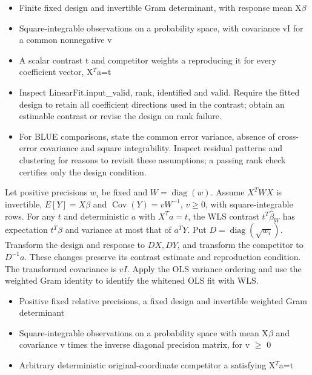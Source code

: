 \expandafter\def\csname statadic@assumptions@STATADIC-LINEAR-010\endcsname{\begin{itemize}
\item Finite fixed design and invertible Gram determinant, with response mean X\ensuremath{\beta}
\item Square-integrable observations on a probability space, with covariance vI for a common nonnegative v
\item A scalar contrast t and competitor weights a reproducing it for every coefficient vector, X\ensuremath{{}^T}a=t
\end{itemize}}
\expandafter\def\csname statadic@diagnostics@STATADIC-LINEAR-010\endcsname{\begin{itemize}
\item Inspect LinearFit.input\_valid, rank, identified and valid. Require the fitted design to retain all coefficient directions used in the contrast; obtain an estimable contrast or revise the design on rank failure.
\item For BLUE comparisons, state the common error variance, absence of cross-error covariance and square integrability. Inspect residual patterns and clustering for reasons to revisit these assumptions; a passing rank check certifies only the design condition.
\end{itemize}}
\expandafter\def\csname statadic@statement@STATADIC-LINEAR-011\endcsname{Let positive precisions $w_i$ be fixed and
  $W=\operatorname{diag}(w)$. Assume $X^TWX$ is invertible, $E[Y]=X\beta$
  and $\operatorname{Cov}(Y)=vW^{-1}$, $v\ge0$, with square-integrable rows.
  For any $t$ and deterministic $a$ with $X^Ta=t$, the WLS contrast
  $t^T\hat\beta_W$ has expectation $t^T\beta$ and variance at most that of $a^TY$.}
\expandafter\def\csname statadic@proof@STATADIC-LINEAR-011\endcsname{Put $D=\operatorname{diag}(\sqrt{w_i})$. Transform the design
  and response to $DX,DY$, and transform the competitor to $D^{-1}a$.
  These changes preserve its contrast estimate and reproduction condition.
  The transformed covariance is $vI$. Apply the OLS variance ordering and use
  the weighted Gram identity to identify the whitened OLS fit with WLS.}
\expandafter\def\csname statadic@assumptions@STATADIC-LINEAR-011\endcsname{\begin{itemize}
\item Positive fixed relative precisions, a fixed design and invertible weighted Gram determinant
\item Square-integrable observations on a probability space with mean X\ensuremath{\beta} and covariance v times the inverse diagonal precision matrix, for v \ensuremath{\ge} 0
\item Arbitrary deterministic original-coordinate competitor a satisfying X\ensuremath{{}^T}a=t
\end{itemize}}
